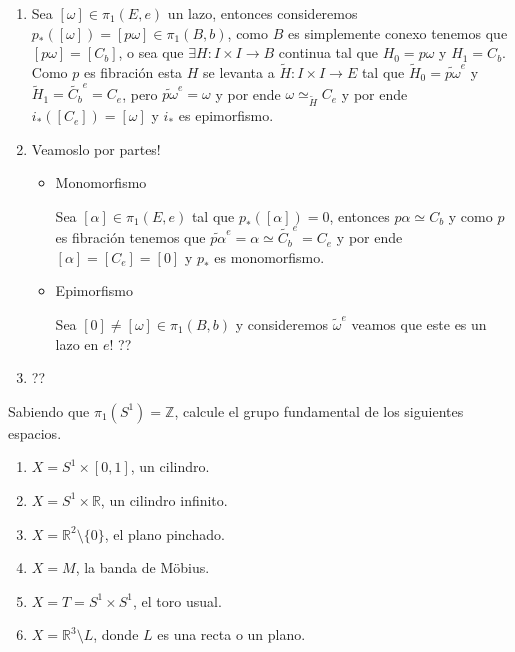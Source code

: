 \documentclass[11pt]{article}
\newcommand{\R}{{\mathbb{R}}}
\newenvironment{proof}[1][Demostraci\'on]{\begin{trivlist}
\item[\hskip \labelsep {\bfseries #1}]}{\end{trivlist}}
\newcommand{\Z}{\mathbb{Z}}
\renewcommand{\P}{\mathcal{P}}
\begin{document}
\begin{enumerate}
\begin{proof}

\begin{enumerate}

\item Sea $[\omega] \in \pi_1(E,e)$ un lazo, entonces consideremos $p_*([\omega])=[p\omega] \in \pi_1(B,b)$, como $B$ es simplemente conexo tenemos que $[p\omega]=[C_b]$, o sea que $\exists H:I \times I \rightarrow B$ continua tal que $H_0 = p\omega$ y $H_1 = C_b$. Como $p$ es fibraci\'on esta $H$ se levanta a $\widetilde{H}: I \times I \rightarrow E$ tal que $\widetilde{H}_0 = \widetilde{p\omega}^{e}$ y $\widetilde{H}_1 = \widetilde{C_b}^{e} = C_e$, pero $\widetilde{p\omega}^{e} = \omega$ y por ende $\omega \simeq_{\widetilde{H}} C_e$ y por ende $i_*([C_e])=[\omega]$ y $i_*$ es epimorfismo.

\item Veamoslo por partes!

\begin{itemize}

\item {Monomorfismo}

Sea $[\alpha] \in \pi_1(E,e)$ tal que $p_*([\alpha]) = 0$, entonces $p\alpha \simeq C_b$ y como $p$ es fibraci\'on tenemos que $\widetilde{p\alpha}^{e} = \alpha \simeq \widetilde{C_b}^{e}=C_e$ y por ende $[\alpha] = [C_e] = [0]$ y $p_*$ es monomorfismo.

\item {Epimorfismo}

Sea $[0] \neq [\omega] \in \pi_1(B,b)$ y consideremos $\widetilde{\omega}^{e}$ veamos que este es un lazo en $e$! ??

\end{itemize}

\item ??

\end{enumerate}

\end{proof}

\item {Sabiendo que $\pi_1(S^1)=\Z$, calcule el grupo fundamental de los siguientes espacios.
\begin{enumerate}
\item $X=S^1 \times [0,1]$, un cilindro.
\item $X=S^1 \times \R$, un cilindro infinito.
\item $X=\R^2\setminus\{0\}$, el plano pinchado.
\item $X=M$, la banda de M\"obius.
\item $X=T=S^1 \times S^1$, el toro usual.
\item $X=\R^3\setminus L$, donde $L$ es una recta o un plano.
\end{enumerate}}


\end{enumerate}
\end{document}
